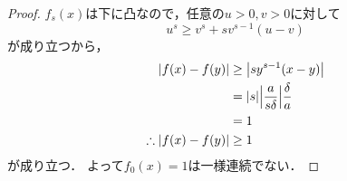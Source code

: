 \begin{enumerate}[(1)]
\begin{enumerate}[(i)]
\begin{enumerate}[(a)]
\begin{proof}
                $f_s(x)$は下に凸なので，任意の$u>0,v>0$に対して
                \begin{equation}
                    u^s\ge v^s+sv^{s-1}(u-v)
                \end{equation}
                が成り立つから，
                \begin{align}
                    \abs{f(x)-f(y)}
                    &\ge\abs{sy^{s-1}(x-y)}\\
                    &=\abs{s}\abs{\frac{a}{s\delta}}\frac{\delta}{a}\\
                    &=1\\
                    \therefore
                    \abs{f(x)-f(y)}
                    &\ge 1
                \end{align}
                が成り立つ．
                よって$f_0(x)=1$は一様連続でない．
            \end{proof}
        \end{enumerate}
    \end{enumerate}
\end{enumerate}

